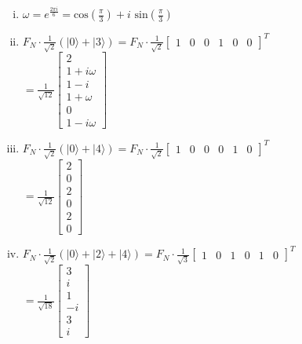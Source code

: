 \documentclass[11pt]{article}
\newenvironment{solution}{\begin{mdframed}[skipabove=\baselineskip,innertopmargin=\baselineskip,innerbottommargin=\baselineskip]
  }{\end{mdframed}}
\begin{document}
\begin{solution}
\begin{enumerate}[(i)]
    \item $\omega = e^{\frac{2\pi i}{6}} = \text{cos}(\frac{\pi}{3}) + i \text{ sin}(\frac{\pi}{3})$
    
    \item $F_N \cdot \frac{1}{\sqrt{2}}(|0\rangle +|3\rangle) = F_N \cdot 
    \frac{1}{\sqrt{2}}\begin{bmatrix} 1 & 0 & 0 & 1 & 0 & 0 \end{bmatrix}^T$ \\
    $= \frac{1}{\sqrt{12}}
    \begin{bmatrix} 2 \\ 1+i\omega \\ 1-i \\ 1+\omega \\ 0 \\ 1-i\omega \end{bmatrix}$
    
    \item $F_N \cdot \frac{1}{\sqrt{2}}(|0\rangle +|4\rangle) = F_N \cdot 
    \frac{1}{\sqrt{2}}\begin{bmatrix} 1 & 0 & 0 & 0 & 1 & 0 \end{bmatrix}^T$\\
    $= \frac{1}{\sqrt{12}}
    \begin{bmatrix} 2 \\ 0 \\ 2 \\ 0 \\ 2 \\ 0 \end{bmatrix}$
    
    \item $F_N \cdot \frac{1}{\sqrt{2}}(|0\rangle +|2\rangle+|4\rangle) = F_N \cdot 
    \frac{1}{\sqrt{3}}\begin{bmatrix} 1 & 0 & 1 & 0 & 1 & 0 \end{bmatrix}^T$\\
    $= \frac{1}{\sqrt{18}}
    \begin{bmatrix} 3 \\ i \\ 1 \\ -i \\ 3 \\ i \end{bmatrix}$
    

\end{enumerate}
\end{solution}
\end{document}
